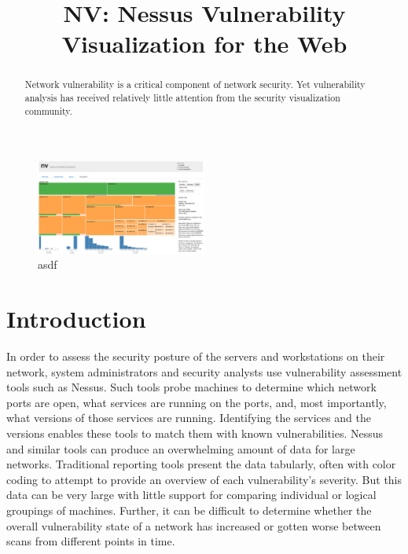 \documentclass{acm_proc_article-sp}
\begin{document}
\title{NV: Nessus Vulnerability Visualization for the Web}


\author{
}

\maketitle
\begin{abstract}

Network vulnerability is a critical component of network security. 
Yet vulnerability analysis has received relatively little attention from the security visualization community.  

\end{abstract}




\begin{figure}
  \centering
  \includegraphics[width=0.5\textwidth]{../screenshots/overview}
  \caption{asdf}
\end{figure}

\section{Introduction}
In order to assess the security posture of the servers and workstations on their network, system administrators and security analysts use vulnerability assessment tools such as Nessus. 
Such tools probe machines to determine which network ports are open, what services are running on the ports, and, most importantly, what versions of those services are running. 
Identifying the services and the versions enables these tools to match them with known vulnerabilities. 
Nessus and similar tools can produce an overwhelming amount of data for large networks. 
Traditional reporting tools present the data tabularly, often with color coding to attempt to provide an overview of each vulnerability's severity. 
But this data can be very large with little support for comparing individual or logical groupings of machines. 
Further, it can be difficult to determine whether the overall vulnerability state of a network has increased or gotten worse between scans from different points in time.
\end{document}
